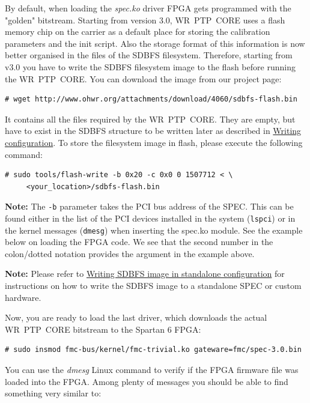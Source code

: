 \documentclass[a4paper, 12pt]{article}
\newcommand{\code}[1]{\texttt{#1}}
\newcommand{\link}[1]{\hyperref[#1]{#1}}
\newcommand{\codeHook}[1]{\mbox{\ttfamily\MakeTextUppercase{#1}}}
\begin{document}
By default, when loading the \textit{spec.ko} driver FPGA gets programmed with
the "golden" bitstream. Starting from version 3.0, \codeHook{wr ptp core} uses a flash
memory chip on the carrier as a default place for storing the calibration
parameters and the init script. Also the storage format of this information is
now better organised in the files of the \codeHook{sdbfs} filesystem. Therefore,
starting from v3.0 you have to write the \codeHook{sdbfs} filesystem image to the
flash before running the \codeHook{wr ptp core}. You can download the image from our
project page:
\begin{lstlisting}
# wget http://www.ohwr.org/attachments/download/4060/sdbfs-flash.bin
\end{lstlisting}
It contains all the files required by the \codeHook{wr ptp core}. They are empty, but
have to exist in the \codeHook{sdbfs} structure to be written later as described in
\link{Writing configuration}. To store the filesystem image in flash, please
execute the following command:
\begin{lstlisting}
# sudo tools/flash-write -b 0x20 -c 0x0 0 1507712 < \
     <your_location>/sdbfs-flash.bin
\end{lstlisting}

\textbf{Note:} The \code{-b} parameter takes the PCI bus address of the SPEC. This
can be found either in the list of the PCI devices installed in the system
(\code{lspci}) or in the kernel messages (\code{dmesg}) when inserting the
spec.ko module. See the example below on loading the FPGA code. We see that the
second number in the colon/dotted notation provides the argument in the example
above.

\textbf{Note:} Please refer to \link{Writing SDBFS image in standalone configuration}
for instructions on how to write the \codeHook{sdbfs} image to a standalone \codeHook{spec}
or custom hardware.

\vspace{1em}
Now, you are ready to load the last driver, which downloads the actual
\codeHook{wr ptp core} bitstream to the Spartan 6 FPGA:
\begin{lstlisting}
# sudo insmod fmc-bus/kernel/fmc-trivial.ko gateware=fmc/spec-3.0.bin
\end{lstlisting}

You can use the \textit{dmesg} Linux command to verify if the FPGA firmware file was
loaded into the FPGA. Among plenty of messages you should be able to find
something very similar to:
\end{document}
